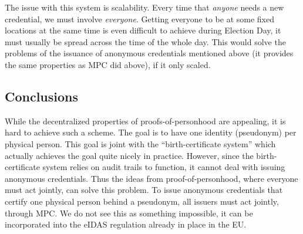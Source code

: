 The issue with this system is scalability.
Every time that \emph{anyone} needs a new credential, we must involve 
\emph{everyone}.
Getting everyone to be at some fixed locations at the same time is even 
difficult to achieve during Election Day, it must usually be spread across the 
time of the whole day.
This would solve the problems of the issuance of anonymous credentials 
mentioned above (it provides the same properties as \ac{MPC} did above), if it 
only scaled.


\subsection{Conclusions}

While the decentralized properties of proofs-of-personhood are appealing, it is 
hard to achieve such a scheme.
The goal is to have one identity (pseudonym) per physical person.
This goal is joint with the \enquote{birth-certificate system} which actually 
achieves the goal quite nicely in practice.
However, since the birth-certificate system relies on audit trails to function, 
it cannot deal with issuing anonymous credentials.
Thus the ideas from proof-of-personhood, where everyone must act jointly, can 
solve this problem.
To issue anonymous credentials that certify one physical person behind a 
pseudonym, all issuers must act jointly, \eg through \ac{MPC}.
We do not see this as something impossible, \eg it can be incorporated into the 
eIDAS regulation already in place in the EU.
